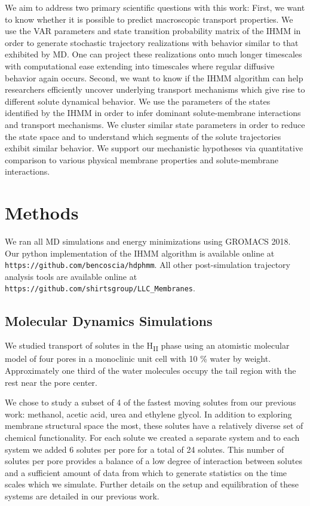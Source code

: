 \documentclass[journal=jpcbfk,manuscript=article]{achemso}
\begin{document}
  We aim to address two primary scientific questions with this work:
  First, we want to know whether it is possible to predict macroscopic transport
  properties. We use the VAR parameters and state transition probability matrix of
  the IHMM in order to generate stochastic trajectory realizations with behavior 
  similar to that exhibited by MD. One can project these realizations onto much 
  longer timescales with computational ease extending into timescales where 
  regular diffusive behavior again occurs.
  Second, we want to know if the IHMM algorithm can help researchers
  efficiently uncover underlying transport mechanisms which give rise to different 
  solute dynamical behavior.
  We use the parameters of the states identified by the IHMM in order to infer 
  dominant solute-membrane interactions and transport mechanisms. We cluster similar 
  state parameters in order to reduce the state space and to understand which segments 
  of the solute trajectories exhibit similar behavior. We support our mechanistic 
  hypotheses via quantitative comparison to various physical membrane properties and
  solute-membrane interactions.
  
  \section{Methods}
    
  We ran all MD simulations and energy minimizations using GROMACS 2018.
  ~\cite{bekker_gromacs:_1993,berendsen_gromacs:_1995,van_der_spoel_gromacs:_2005,hess_gromacs_2008}  
  Our python implementation of the IHMM algorithm is available online at \\
  \texttt{https://github.com/bencoscia/hdphmm}. All other post-simulation 
  trajectory analysis tools are available online at
  \texttt{https://github.com/shirtsgroup/LLC\_Membranes}.

  \subsection{Molecular Dynamics Simulations}

  We studied transport of solutes in the H\textsubscript{II} phase using an
  atomistic molecular model of four pores in a monoclinic unit cell with 
  10 \% water by weight. Approximately one third of the water molecules 
  occupy the tail region with the rest near the pore center.
  
  We chose to study a subset of 4 of the fastest moving solutes from our previous
  work: methanol, acetic acid, urea and ethylene glycol.
  In addition to exploring membrane structural space the most, these solutes have a
  relatively diverse set of chemical functionality. For each solute we created a 
  separate system and to 
  each system we added 6 solutes per pore for a total of 24 solutes. This number 
  of solutes per pore provides a balance of a low degree of interaction between 
  solutes and a sufficient amount of data from which to generate statistics on the
  time scales which we simulate. Further details on the setup and equilibration of
  these systems are detailed in our previous work.\cite{coscia_chemically_2019}
  
\end{document}
